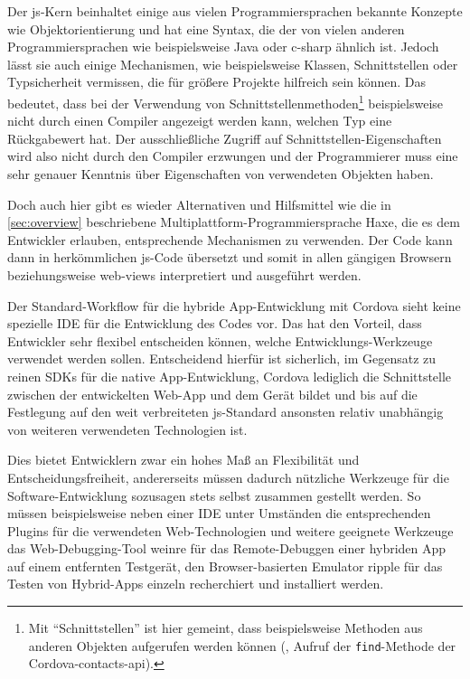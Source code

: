 Der \gls{js}-Kern beinhaltet einige aus vielen Programmiersprachen bekannte Konzepte wie Objektorientierung und hat eine Syntax, die der von vielen anderen Programmiersprachen wie beispielsweise Java oder \gls{c-sharp} ähnlich ist.
Jedoch lässt sie auch einige Mechanismen, wie beispielsweise Klassen, Schnittstellen oder Typsicherheit vermissen, die \zB für größere Projekte hilfreich sein können. 
Das bedeutet, dass bei der Verwendung von Schnittstellenmethoden\footnote{Mit \enquote{Schnittstellen} ist hier gemeint, dass beispielsweise Methoden aus anderen Objekten aufgerufen werden können (, Aufruf der \lstinline|find|-Methode der Cordova-\gls{contacts-api}).} beispielsweise nicht durch einen Compiler angezeigt werden kann, welchen Typ eine Rückgabewert hat.
Der ausschließliche Zugriff auf Schnittstellen-Eigenschaften wird also nicht durch den Compiler erzwungen und der Programmierer muss eine sehr genauer Kenntnis über Eigenschaften von verwendeten Objekten haben.

Doch auch hier gibt es wieder Alternativen und Hilfsmittel wie \zB die in \autoref{sec:overview} beschriebene Multiplattform-Programmiersprache Haxe, die es dem Entwickler erlauben, entsprechende Mechanismen zu verwenden.
Der Code kann dann in herkömmlichen \gls{js}-Code übersetzt und somit in allen gängigen Browsern beziehungsweise \glspl{web-view} interpretiert und ausgeführt werden.

Der Standard-Workflow für die hybride App-Entwicklung mit Cordova sieht keine spezielle IDE für die Entwicklung des Codes vor. 
Das hat den Vorteil, dass Entwickler sehr flexibel entscheiden können, welche Entwicklungs-Werkzeuge verwendet werden sollen. 
Entscheidend hierfür ist sicherlich, im Gegensatz zu reinen SDKs für die native App-Entwicklung, Cordova lediglich die Schnittstelle zwischen der entwickelten Web-App und dem Gerät bildet und bis auf die Festlegung auf den weit verbreiteten \gls{js}-Standard ansonsten relativ unabhängig von weiteren verwendeten Technologien ist.

Dies bietet Entwicklern zwar ein hohes Maß an Flexibilität und Entscheidungsfreiheit, andererseits müssen dadurch nützliche Werkzeuge für die Software-Entwicklung sozusagen stets selbst zusammen gestellt werden.
 So müssen beispielsweise neben einer IDE unter Umständen die entsprechenden Plugins für die verwendeten Web-Technologien und weitere geeignete Werkzeuge das Web-Debugging-Tool \gls{weinre} für das Remote-Debuggen einer hybriden App auf einem entfernten Testgerät, den Browser-basierten Emulator \gls{ripple} für das Testen von Hybrid-Apps einzeln recherchiert und installiert werden. 

